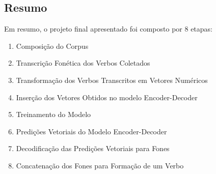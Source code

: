 

\subsection{Resumo}

Em resumo, o projeto final apresentado foi composto por 8 etapas: 

\begin{enumerate}
    \item Composição do Corpus
    \item Transcrição Fonética dos Verbos Coletados
    \item Transformação dos Verbos Transcritos em Vetores Numéricos
    \item Inserção dos Vetores Obtidos no modelo Encoder-Decoder
    \item Treinamento do Modelo
    \item Predições Vetoriais do Modelo Encoder-Decoder
    \item Decodificação das Predições Vetoriais para Fones
    \item Concatenação dos Fones para Formação de um Verbo
\end{enumerate}



